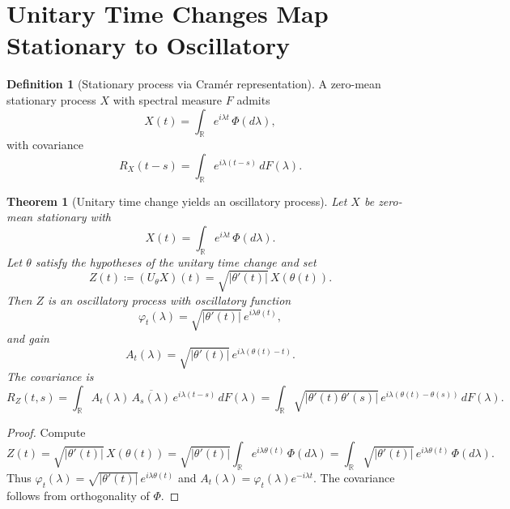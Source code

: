 \documentclass[12pt]{article}
\newtheorem{theorem}{Theorem}
\theoremstyle{definition}
\newtheorem{definition}{Definition}
\theoremstyle{remark}
\begin{document}
\section{Unitary Time Changes Map Stationary to Oscillatory}

\begin{definition}[Stationary process via Cram\'er representation]
A zero-mean stationary process $X$ with spectral measure $F$ admits
\begin{equation}
  X(t) = \int_{\mathbb{R}} e^{i\lambda t}\,\Phi(d\lambda),
\end{equation}
with covariance
\begin{equation}
  R_X(t-s)=\int_{\mathbb{R}} e^{i\lambda(t-s)}\,dF(\lambda).
\end{equation}
\end{definition}

\begin{theorem}[Unitary time change yields an oscillatory process]
Let $X$ be zero-mean stationary with
\[
X(t)=\int_{\mathbb{R}} e^{i\lambda t}\,\Phi(d\lambda).
\]
Let $\theta$ satisfy the hypotheses of the unitary time change and set
\begin{equation}
  Z(t)\coloneqq (U_\theta X)(t)=\sqrt{|\theta'(t)|}\,X(\theta(t)).
\end{equation}
Then $Z$ is an oscillatory process with oscillatory function
\begin{equation}
  \varphi_t(\lambda)=\sqrt{|\theta'(t)|}\,e^{i\lambda \theta(t)},
\end{equation}
and gain
\begin{equation}
  A_t(\lambda)=\sqrt{|\theta'(t)|}\,e^{i\lambda(\theta(t)-t)}.
\end{equation}
The covariance is
\begin{equation}
  R_Z(t,s)=\int_{\mathbb{R}} A_t(\lambda)\,\overline{A_s(\lambda)}\,e^{i\lambda(t-s)}\,dF(\lambda)
  = \int_{\mathbb{R}} \sqrt{|\theta'(t)\theta'(s)|}\,e^{i\lambda(\theta(t)-\theta(s))}\,dF(\lambda).
\end{equation}
\end{theorem}

\begin{proof}
Compute
\[
Z(t)=\sqrt{|\theta'(t)|}\,X(\theta(t))
=\sqrt{|\theta'(t)|}\int_{\mathbb{R}} e^{i\lambda \theta(t)}\,\Phi(d\lambda)
=\int_{\mathbb{R}} \sqrt{|\theta'(t)|}\,e^{i\lambda \theta(t)}\,\Phi(d\lambda).
\]
Thus $\varphi_t(\lambda)=\sqrt{|\theta'(t)|}\,e^{i\lambda \theta(t)}$ and $A_t(\lambda)=\varphi_t(\lambda)e^{-i\lambda t}$. The covariance follows from orthogonality of $\Phi$.
\end{proof}
\end{document}
